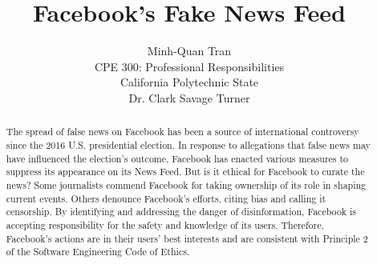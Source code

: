 

\title{\vfill Facebook's Fake News Feed\\
\vspace{8pt}
\normalsize{}
}

\author{Minh-Quan Tran\\
\normalsize{CPE 300: Professional Responsibilities}\\
\normalsize{California Polytechnic State}\\
\normalsize{Dr. Clark Savage Turner}
}

\maketitle


\vfill

\begin{abstract}
The spread of false news on Facebook has been a source of international controversy since the 2016 U.S. presidential election. \cite{telegraph_fn} In response to allegations that false news may have influenced the election's outcome, \cite{tc_snowden,stanford_election} Facebook has enacted various measures to suppress its appearance on its News Feed. \cite{fb_hoaxes_2016,guardian_tips} But is it ethical for Facebook to curate the news? Some journalists commend Facebook for taking ownership of its role in shaping current events. \cite{cnn_fight} Others denounce Facebook's efforts, citing bias \cite{vox_sentences} and calling it censorship. \cite{milo_censor} By identifying and addressing the danger of disinformation, Facebook is accepting responsibility for the safety and knowledge of its users. Therefore, Facebook's actions are in their users' best interests and are consistent with Principle 2 of the Software Engineering Code of Ethics. \cite{se_code} 
\end{abstract}

\thispagestyle{empty} 
\pagebreak
